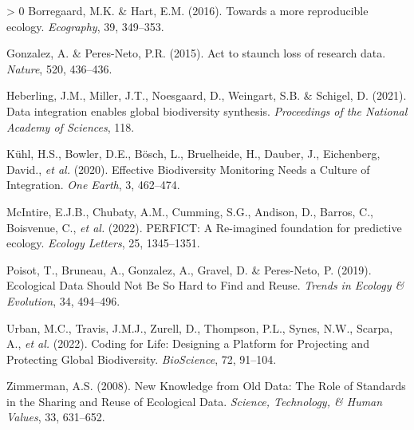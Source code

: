 \documentclass[10pt,oneside]{article}
\newlength{\cslhangindent}
\newenvironment{CSLReferences}[3] %
 {%
  \setlength{\parindent}{0pt}
  \ifodd #1 \everypar{\setlength{\hangindent}{\cslhangindent}}\ignorespaces\fi
  \ifnum #2 > 0
  \setlength{\parskip}{#2\baselineskip}
  \fi
 }%
 {}
\begin{document}
\hypertarget{refs}{}
\begin{CSLReferences}{1}{0}
\leavevmode\hypertarget{ref-Borregaard2016MorRep}{}%
Borregaard, M.K. \& Hart, E.M. (2016). Towards a more reproducible
ecology. \emph{Ecography}, 39, 349--353.

\leavevmode\hypertarget{ref-Gonzalez2015ActSta}{}%
Gonzalez, A. \& Peres-Neto, P.R. (2015). Act to staunch loss of research
data. \emph{Nature}, 520, 436--436.

\leavevmode\hypertarget{ref-Heberling2021DatInt}{}%
Heberling, J.M., Miller, J.T., Noesgaard, D., Weingart, S.B. \& Schigel,
D. (2021). Data integration enables global biodiversity synthesis.
\emph{Proceedings of the National Academy of Sciences}, 118.

\leavevmode\hypertarget{ref-Kuhl2020EffBio}{}%
Kühl, H.S., Bowler, D.E., Bösch, L., Bruelheide, H., Dauber, J.,
Eichenberg, David., \emph{et al.} (2020). Effective Biodiversity
Monitoring Needs a Culture of Integration. \emph{One Earth}, 3,
462--474.

\leavevmode\hypertarget{ref-McIntire2022PerRei}{}%
McIntire, E.J.B., Chubaty, A.M., Cumming, S.G., Andison, D., Barros, C.,
Boisvenue, C., \emph{et al.} (2022). PERFICT: A Re-imagined foundation
for predictive ecology. \emph{Ecology Letters}, 25, 1345--1351.

\leavevmode\hypertarget{ref-Poisot2019EcoDat}{}%
Poisot, T., Bruneau, A., Gonzalez, A., Gravel, D. \& Peres-Neto, P.
(2019). Ecological Data Should Not Be So Hard to Find and Reuse.
\emph{Trends in Ecology \& Evolution}, 34, 494--496.

\leavevmode\hypertarget{ref-Urban2022CodLif}{}%
Urban, M.C., Travis, J.M.J., Zurell, D., Thompson, P.L., Synes, N.W.,
Scarpa, A., \emph{et al.} (2022). Coding for Life: Designing a Platform
for Projecting and Protecting Global Biodiversity. \emph{BioScience},
72, 91--104.

\leavevmode\hypertarget{ref-Zimmerman2008NewKno}{}%
Zimmerman, A.S. (2008). New Knowledge from Old Data: The Role of
Standards in the Sharing and Reuse of Ecological Data. \emph{Science,
Technology, \& Human Values}, 33, 631--652.

\end{CSLReferences}
\end{document}
